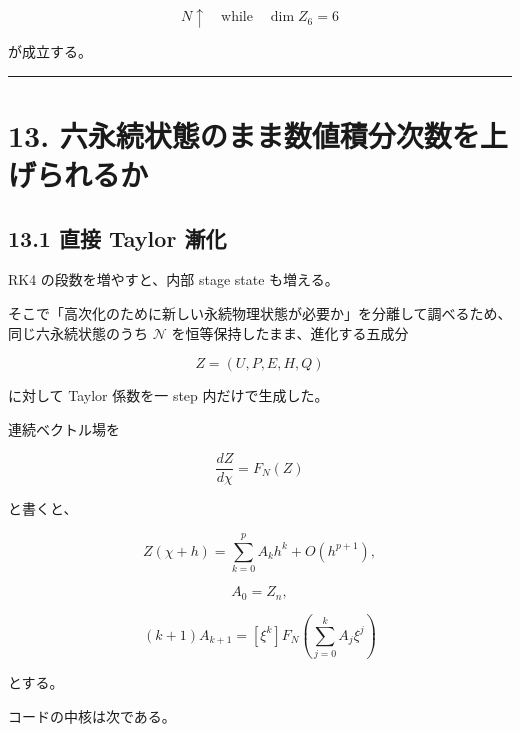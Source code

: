 \documentclass[
  a4paper,
]{ltjsarticle}
\begin{document}
\[
\boxed{
N\uparrow
\quad\text{while}\quad
\dim Z_6=6
}
\]

が成立する。

\begin{center}\rule{0.5\linewidth}{0.5pt}\end{center}

\section{13.
六永続状態のまま数値積分次数を上げられるか}\label{ux516dux6c38ux7d9aux72b6ux614bux306eux307eux307eux6570ux5024ux7a4dux5206ux6b21ux6570ux3092ux4e0aux3052ux3089ux308cux308bux304b}

\subsection{13.1 直接 Taylor
漸化}\label{ux76f4ux63a5-taylor-ux6f38ux5316}

RK4 の段数を増やすと、内部 stage state も増える。

そこで「高次化のために新しい永続物理状態が必要か」を分離して調べるため、同じ六永続状態のうち
\(\mathcal N\) を恒等保持したまま、進化する五成分

\[
Z=(U,P,E,H,Q)
\]

に対して Taylor 係数を一 step 内だけで生成した。

連続ベクトル場を

\[
\frac{dZ}{d\chi}=F_N(Z)
\]

と書くと、

\[
Z(\chi+h)
=\sum_{k=0}^{p}A_k h^k+O(h^{p+1}),
\]

\[
A_0=Z_n,
\]

\[
\boxed{
(k+1)A_{k+1}
=[\xi^k]
F_N\!\left(\sum_{j=0}^{k}A_j\xi^j\right)
}
\]

とする。

コードの中核は次である。
\end{document}
